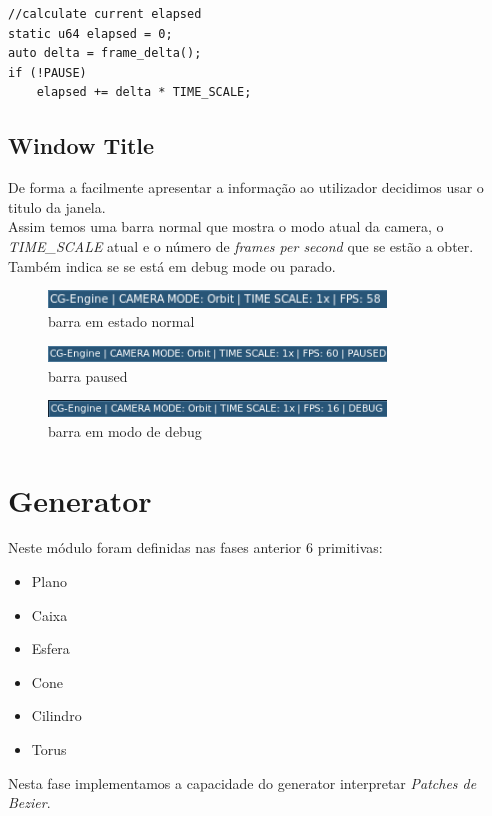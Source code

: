 \documentclass[a4paper]{report}
\begin{document}
\begin{lstlisting}
//calculate current elapsed
static u64 elapsed = 0;
auto delta = frame_delta();
if (!PAUSE)
    elapsed += delta * TIME_SCALE;
\end{lstlisting}

\section{Window Title}
De forma a facilmente apresentar a informação ao utilizador decidimos usar o
titulo da janela.\\
Assim temos uma barra normal que mostra o modo atual da camera, o
\textit{TIME\_SCALE} atual e o número de \textit{frames per second} que se estão
a obter. Também indica se se está em debug mode ou parado.\\
\begin{figure}[H]
    \centering 
    \includegraphics[width=0.8\textwidth]{images/normal_bar.png}
    \caption{barra em estado normal}
\end{figure}
\begin{figure}[H]
    \centering 
    \includegraphics[width=0.8\textwidth]{images/paused_bar.png}
    \caption{barra paused}
\end{figure}
\begin{figure}[H]
    \centering 
    \includegraphics[width=0.8\textwidth]{images/debug_bar.png}
    \caption{barra em modo de debug}
\end{figure}

\chapter{Generator}
Neste módulo foram definidas nas fases anterior 6 primitivas:
\begin{itemize}
        \item Plano
        \item Caixa
        \item Esfera
        \item Cone
        \item Cilindro
        \item Torus
\end{itemize}
Nesta fase implementamos a capacidade do generator interpretar \textit{Patches
de Bezier}.
\end{document}
